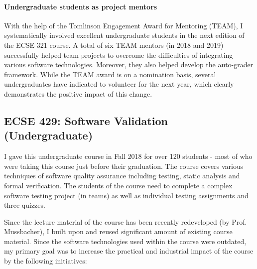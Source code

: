 \documentclass[a4paper,11pt]{article}
\begin{document}
\paragraph{Undergraduate students as project mentors}
With the help of the Tomlinson Engagement Award for Mentoring (TEAM), I systematically involved excellent undergraduate students in the next edition of the ECSE 321 course. A total of six TEAM mentors (in 2018 and 2019) successfully helped team projects to overcome the difficulties of integrating various software technologies. Moreover, they also helped develop the auto-grader framework. While the TEAM award is on a nomination basis, several undergraduates have indicated to volunteer for the next year, which clearly demonstrates the positive impact of this change.


\subsection{ECSE 429: Software Validation (Undergraduate)}

I gave this undergraduate course in Fall 2018 for over 120 students - most of who were taking this course just before their graduation. The course covers various techniques of software quality assurance including testing, static analysis and formal verification. The students of the course need to complete a complex software testing project (in teams) as well as individual testing assignments and three quizzes.

Since the lecture material of the course has been recently redeveloped (by Prof. Mussbacher), I built upon and reused significant amount of existing course material. Since the software technologies used within the course were outdated, my primary goal was to increase the practical and industrial impact of the course by the following initiatives:
\end{document}
